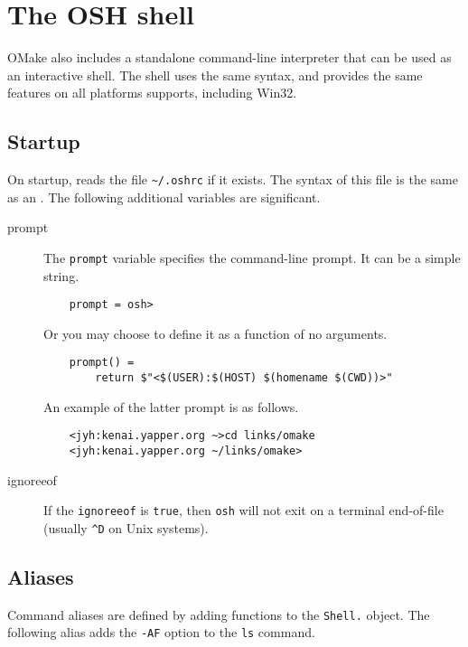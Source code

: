 %
%
%

\section{The OSH shell}

OMake also includes a standalone command-line interpreter  that can be used as an
interactive shell.  The shell uses the same syntax, and provides the same features on all platforms
 supports, including Win32.

\subsection{Startup}

On startup,  reads the file \verb+~/.oshrc+ if it exists.  The syntax of this file is the
same as an .  The following additional variables are significant.

\begin{description}
\item[prompt]  The \verb+prompt+ variable specifies the command-line prompt.
It can be a simple string.

\begin{verbatim}
    prompt = osh>
\end{verbatim}

Or you may choose to define it as a function of no arguments.

\begin{verbatim}
    prompt() =
        return $"<$(USER):$(HOST) $(homename $(CWD))>"
\end{verbatim}

An example of the latter prompt is as follows.

\begin{verbatim}
    <jyh:kenai.yapper.org ~>cd links/omake
    <jyh:kenai.yapper.org ~/links/omake>
\end{verbatim}

\item[ignoreeof]
   If the \verb+ignoreeof+ is \verb+true+, then \verb+osh+ will not exit on
   a terminal end-of-file (usually \verb+^D+ on Unix systems).
\end{description}

\subsection{Aliases}

Command aliases are defined by adding functions to the \verb+Shell.+ object.  The following alias
adds the \verb+-AF+ option to the \verb+ls+ command.

